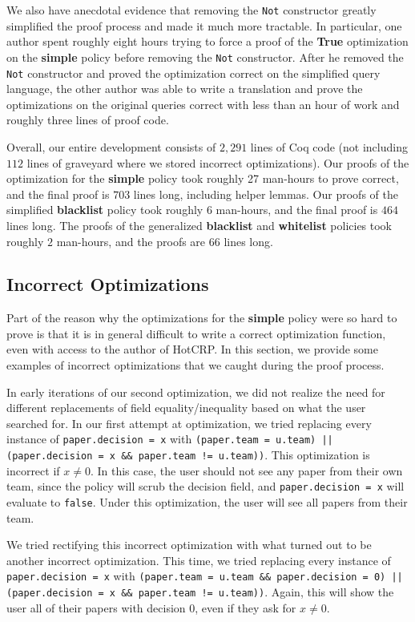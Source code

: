 \documentclass[11pt,journal]{IEEEtran}
\begin{document}
We also have anecdotal evidence that removing the \texttt{Not} constructor greatly simplified the proof process and made it much more tractable.  In particular, one author spent roughly eight hours trying to force a proof of the \textbf{True} optimization on the \textbf{simple} policy before removing the \texttt{Not} constructor.  After he removed the \texttt{Not} constructor and proved the optimization correct on the simplified query language, the other author was able to write a translation and prove the optimizations on the original queries correct with less than an hour of work and roughly three lines of proof code.

Overall, our entire development consists of $2,291$ lines of Coq code (not including $112$ lines of graveyard where we stored incorrect optimizations).  Our proofs of the optimization for the \textbf{simple} policy took roughly 27 man-hours to prove correct, and the final proof is $703$ lines long, including helper lemmas.  Our proofs of the simplified \textbf{blacklist} policy took roughly $6$ man-hours, and the final proof is $464$ lines long.  The proofs of the generalized \textbf{blacklist} and \textbf{whitelist} policies took roughly $2$ man-hours, and the proofs are $66$ lines long.

\subsection{Incorrect Optimizations}
\label{sec:incorrect}
Part of the reason why the optimizations for the \textbf{simple} policy were so hard to prove is that it is in general difficult to write a correct optimization function, even with access to the author of HotCRP.  In this section, we provide some examples of incorrect optimizations that we caught during the proof process.

In early iterations of our second optimization, we did not realize the need for different replacements of field equality/inequality based on what the user searched for.  In our first attempt at optimization, we tried replacing every instance of \texttt{paper.decision = x} with \texttt{(paper.team = u.team) || (paper.decision = x \&\& paper.team != u.team))}.  This optimization is incorrect if $x \neq 0$.  In this case, the user should not see any paper from their own team, since the policy will scrub the decision field, and \texttt{paper.decision = x} will evaluate to \texttt{false}.  Under this optimization, the user will see all papers from their team.

We tried rectifying this incorrect optimization with what turned out to be another incorrect optimization.  This time, we tried replacing every instance of \texttt{paper.decision = x} with \texttt{(paper.team = u.team \&\& paper.decision = 0) || (paper.decision = x \&\& paper.team != u.team))}.  Again, this will show the user all of their papers with decision $0$, even if they ask for $x \neq 0$.
\end{document}
